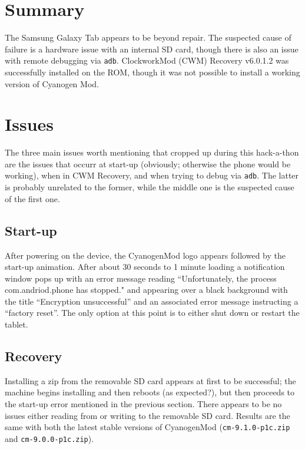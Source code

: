 \documentclass{article}
\begin{document}
\section{Summary}

The Samsung Galaxy Tab appears to be beyond repair. The suspected cause of failure is a hardware issue with an internal SD card, though there is also an issue with remote debugging via \texttt{adb}. ClockworkMod (CWM) Recovery v6.0.1.2 was successfully installed on the ROM, though it was not possible to install a working version of Cyanogen Mod.

\section{Issues}

The three main issues worth mentioning that cropped up during this hack-a-thon are the issues that occurr at start-up (obviously; otherwise the phone would be working), when in CWM Recovery, and when trying to debug via \texttt{adb}. The latter is probably unrelated to the former, while the middle one is the suspected cause of the first one.

\subsection{Start-up}

After powering on the device, the CyanogenMod logo appears followed by the start-up animation. After about 30 seconds to 1 minute loading a notification window pops up with an error message reading ``Unfortunately, the process com.andriod.phone has stopped." and appearing over a black background with the title ``Encryption unsuccessful'' and an associated error message instructing a ``factory reset''. The only option at this point is to either shut down or restart the tablet.

\subsection{Recovery}

Installing a zip from the removable SD card appears at first to be successful; the machine begins installing and then reboots (as expected?), but then proceeds to the start-up error mentioned in the previous section. There appears to be no issues either reading from or writing to the removable SD card. Results are the same with both the latest stable versions of CyanogenMod (\texttt{cm-9.1.0-p1c.zip} and \texttt{cm-9.0.0-p1c.zip}).
\end{document}
